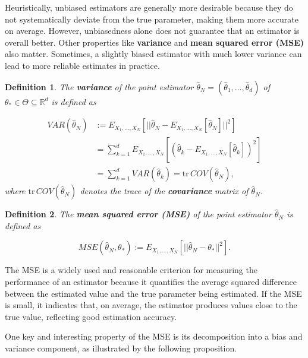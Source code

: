 \documentclass{report}
\newtheorem{definition}{Definition}[chapter]
\begin{document}
Heuristically, unbiased estimators are generally more desirable because they do not systematically deviate from the true parameter, making them more accurate on average. However, unbiasedness alone does not guarantee that an estimator is overall better. Other properties like \textbf{variance} and \textbf{mean squared error (MSE)} also matter. Sometimes, a slightly biased estimator with much lower variance can lead to more reliable estimates in practice.

\begin{definition}
The \textbf{variance} of the point estimator $\hat{\theta}_N = (\hat{\theta}_{1},\dots,\hat{\theta}_{d})$ of $\theta_* \in \Theta \subseteq \mathbb{R}^d$ is defined as

\begin{equation}
\begin{split}
VAR(\hat{\theta}_N) & := E_{X_1,\dots,X_N}[||\hat{\theta}_N-E_{X_1,\dots,X_N}[\hat{\theta}_N]||^2] \\
& = \sum_{k=1}^{d}E_{X_1,\dots,X_N}[(\hat{\theta}_{k}-E_{X_1,\dots,X_N}[\hat{\theta}_{k}])^2] \\
& = \sum_{k=1}^{d}VAR(\hat{\theta}_{k}) = \mathrm{tr}\,COV(\hat{\theta}_N),
\end{split}
\end{equation}
where $\mathrm{tr}\,COV(\hat{\theta}_N)$ denotes the trace of the \textbf{covariance} matrix of $\hat{\theta}_N$.
\end{definition}

\begin{definition}
The \textbf{mean squared error (MSE)} of the point estimator $\hat{\theta}_N$ is defined as

\begin{equation}
MSE(\hat{\theta}_N,\theta_*) := E_{X_1,\dots,X_N}[||\hat{\theta}_N - \theta_*||^2].
\end{equation}
\end{definition}
The MSE is a widely used and reasonable criterion for measuring the performance of an estimator because it quantifies the average squared difference between the estimated value and the true parameter being estimated. If the MSE is small, it indicates that, on average, the estimator produces values close to the true value, reflecting good estimation accuracy.

One key and interesting property of the MSE is its decomposition into a bias and variance component, as illustrated by the following proposition.
\end{document}
